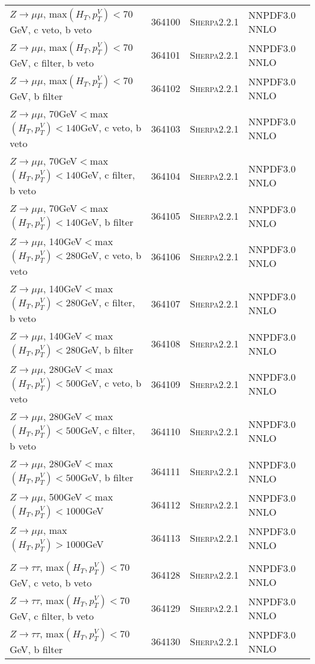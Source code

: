 \begin{table}[h!]
\begin{center}
{\begin{tabular}{@{} lcll @{}}
$Z\rightarrow \mu\mu$, max$(H_T,p_T^V)<70$GeV, c veto, b veto &  364100&  \textsc{Sherpa2.2.1} &NNPDF3.0 NNLO \\
$Z\rightarrow \mu\mu$, max$(H_T,p_T^V)<70$GeV, c filter, b veto & 364101&  \textsc{Sherpa2.2.1} &NNPDF3.0 NNLO \\
$Z\rightarrow \mu\mu$, max$(H_T,p_T^V)<70$GeV, b filter & 364102&  \textsc{Sherpa2.2.1} &NNPDF3.0 NNLO \\
$Z\rightarrow \mu\mu$, 70GeV$<$max$(H_T,p_T^V)<140$GeV, c veto, b veto & 364103& \textsc{Sherpa2.2.1} &NNPDF3.0 NNLO \\
$Z\rightarrow \mu\mu$, 70GeV$<$max$(H_T,p_T^V)<140$GeV, c filter, b veto & 364104& \textsc{Sherpa2.2.1} &NNPDF3.0 NNLO \\
$Z\rightarrow \mu\mu$, 70GeV$<$max$(H_T,p_T^V)<140$GeV, b filter & 364105& \textsc{Sherpa2.2.1} &NNPDF3.0 NNLO \\
$Z\rightarrow \mu\mu$, 140GeV$<$max$(H_T,p_T^V)<280$GeV, c veto, b veto & 364106&  \textsc{Sherpa2.2.1} &NNPDF3.0 NNLO \\
$Z\rightarrow \mu\mu$, 140GeV$<$max$(H_T,p_T^V)<280$GeV, c filter, b veto & 364107& \textsc{Sherpa2.2.1} &NNPDF3.0 NNLO \\
$Z\rightarrow \mu\mu$, 140GeV$<$max$(H_T,p_T^V)<280$GeV, b filter & 364108& \textsc{Sherpa2.2.1} &NNPDF3.0 NNLO \\
$Z\rightarrow \mu\mu$, 280GeV$<$max$(H_T,p_T^V)<500$GeV, c veto, b veto & 364109& \textsc{Sherpa2.2.1} &NNPDF3.0 NNLO \\
$Z\rightarrow \mu\mu$, 280GeV$<$max$(H_T,p_T^V)<500$GeV, c filter, b veto & 364110& \textsc{Sherpa2.2.1} &NNPDF3.0 NNLO \\
$Z\rightarrow \mu\mu$, 280GeV$<$max$(H_T,p_T^V)<500$GeV, b filter &  364111& \textsc{Sherpa2.2.1} &NNPDF3.0 NNLO \\
$Z\rightarrow \mu\mu$, 500GeV$<$max$(H_T,p_T^V)<1000$GeV & 364112& \textsc{Sherpa2.2.1} &NNPDF3.0 NNLO \\
$Z\rightarrow \mu\mu$, max$(H_T,p_T^V)>1000$GeV&  364113&  	 \textsc{Sherpa2.2.1} &NNPDF3.0 NNLO \\	\\
$Z\rightarrow \tau\tau$, max$(H_T,p_T^V)<70$GeV, c veto, b veto &  364128&  \textsc{Sherpa2.2.1} &NNPDF3.0 NNLO \\
$Z\rightarrow \tau\tau$, max$(H_T,p_T^V)<70$GeV, c filter, b veto & 364129&  \textsc{Sherpa2.2.1} &NNPDF3.0 NNLO \\
$Z\rightarrow \tau\tau$, max$(H_T,p_T^V)<70$GeV, b filter & 364130&  \textsc{Sherpa2.2.1} &NNPDF3.0 NNLO \\

\end{tabular}}
\end{center}
\end{table}
